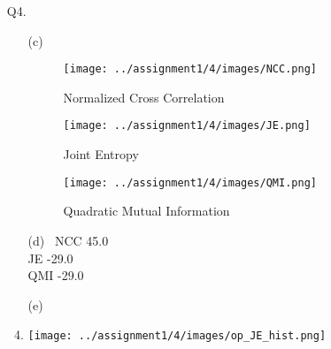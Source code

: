 \documentclass[11pt]{article}
\begin{document}
\maketitle

\begin{enumerate}
\item[Q4.]
\begin{enumerate}

\item[(c)] \
\begin{figure}[!htb]
      \texttt{[image: ../assignment1/4/images/NCC.png]}
      \caption*{Normalized Cross Correlation}
    \endminipage\hfill
      \texttt{[image: ../assignment1/4/images/JE.png]}
      \caption*{Joint Entropy}
    \endminipage\hfill
      \texttt{[image: ../assignment1/4/images/QMI.png]}
      \caption*{Quadratic Mutual Information}
    \endminipage
\end{figure}

\item [(d)] \
NCC 45.0 \\
JE -29.0 \\
QMI -29.0 \\

\item [(e)] \
\item \texttt{[image: ../assignment1/4/images/op\_JE\_hist.png]}

\end{enumerate}
\end{enumerate}
\end{document}
